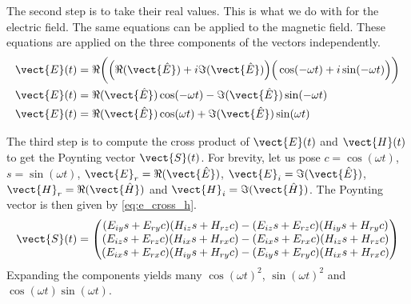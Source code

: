 The second step is to take their real values.
This is what we do with  for the electric field.
The same equations can be applied to the magnetic field.
These equations are applied on the three components of the vectors independently.
\begin{subequations}
\begin{align}
    \vect{E}(t) &= \Re
    \bigg(
        \Big(
            \Re(\vect{\hat{E}}) + i \Im(\vect{\hat{E}})
        \Big)
        \Big(
            \cos(- \omega t) + i \sin(- \omega t)
        \Big)
    \bigg)
    \label{eq:e_time_real_0}
    \\
    \vect{E}(t) &= \Re(\vect{\hat{E}}) \cos(- \omega t)
            -
            \Im(\vect{\hat{E}}) \sin(- \omega t)
    \label{eq:e_time_real_1}
    \\
    \vect{E}(t) &= \Re(\vect{\hat{E}}) \cos(\omega t)
            +
            \Im(\vect{\hat{E}}) \sin(\omega t)
    \label{eq:e_time_real_2}
\end{align}
    \label{eq:e_time_real}
\end{subequations}

The third step is to compute the cross product of $\vect{E}(t)$ and $\vect{H}(t)$ to get the Poynting vector $\vect{S}(t)$.
For brevity, let us pose $c=\cos(\omega t)$, $s=\sin(\omega t)$,
$\vect{E}_r = \Re(\vect{\hat{E}})$, $\vect{E}_i = \Im(\vect{\hat{E}})$,
$\vect{H}_r = \Re(\vect{\hat{H}})$ and $\vect{H}_i = \Im(\vect{\hat{H}})$.
The Poynting vector is then given by \cref{eq:e_cross_h}.
\begin{equation}
    \vect{S}(t)
    =
    \begin{pmatrix}
         (E_{iy} s + E_{ry} c) (H_{iz} s + H_{rz} c) -
         (E_{iz} s + E_{rz} c) (H_{iy} s + H_{ry} c)
         \\
         (E_{iz} s + E_{rz} c) (H_{ix} s + H_{rx} c) -
         (E_{ix} s + E_{rx} c) (H_{iz} s + H_{rz} c)
         \\
         (E_{ix} s + E_{rx} c) (H_{iy} s + H_{ry} c) -
         (E_{iy} s + E_{ry} c) (H_{ix} s + H_{rx} c)
    \end{pmatrix}
    \label{eq:e_cross_h}
\end{equation}
Expanding the components yields many $\cos(\omega t)^2$, $\sin(\omega t)^2$ and $\cos(\omega t)\sin(\omega t)$.

